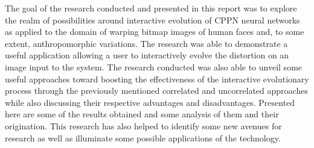 The goal of the research conducted and presented in this report was to explore the realm of possibilities around interactive evolution of CPPN neural networks as applied to the domain of warping bitmap images of human faces and, to some extent, anthropomorphic variations. The research was able to demonstrate a useful application allowing a user to interactively evolve the distortion on an image input to the system. The research conducted was also able to unveil some useful approaches toward boosting the effectiveness of the interactive evolutionary process through the previously mentioned correlated and uncorrelated approaches while also discussing their respective advantages and disadvantages. Presented here are some of the results obtained and some analysis of them and their origination. This research has also helped to identify some new avenues for research as well as illuminate some possible applications of the technology.